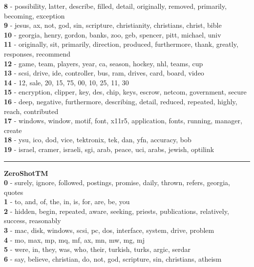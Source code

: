 \textbf{8} - possibility, latter, describe, filled, detail, originally, removed, primarily, becoming, exception\\
\textbf{9} - jesus, ax, not, god, sin, scripture, christianity, christians, christ, bible\\
\textbf{10} - georgia, henry, gordon, banks, zoo, geb, spencer, pitt, michael, univ\\
\textbf{11} - originally, sit, primarily, direction, produced, furthermore, thank, greatly, responses, recommend\\
\textbf{12} - game, team, players, year, ca, season, hockey, nhl, teams, cup\\
\textbf{13} - scsi, drive, ide, controller, bus, ram, drives, card, board, video\\
\textbf{14} - 12, sale, 20, 15, 75, 00, 10, 25, 11, 30\\
\textbf{15} - encryption, clipper, key, des, chip, keys, escrow, netcom, government, secure\\
\textbf{16} - deep, negative, furthermore, describing, detail, reduced, repeated, highly, reach, contributed\\
\textbf{17} - windows, window, motif, font, x11r5, application, fonts, running, manager, create\\
\textbf{18} - ysu, ico, dod, vice, tektronix, tek, dan, yfn, accuracy, bob\\
\textbf{19} - israel, cramer, israeli, sgi, arab, peace, uci, arabs, jewish, optilink\\
\hrule\vspace{2mm}
\noindent
\textbf{ZeroShotTM}\vspace{2mm}\\
\vspace{2mm}
\noindent
\textbf{0} - surely, ignore, followed, postings, promise, daily, thrown, refers, georgia, quotes\\
\textbf{1} - to, and, of, the, in, is, for, are, be, you\\
\textbf{2} - hidden, begin, repeated, aware, seeking, priests, publications, relatively, success, reasonably\\
\textbf{3} - mac, disk, windows, scsi, pc, dos, interface, system, drive, problem\\
\textbf{4} - mo, max, mp, mq, mf, ax, mn, mw, mg, mj\\
\textbf{5} - were, in, they, was, who, their, turkish, turks, argic, serdar\\
\textbf{6} - say, believe, christian, do, not, god, scripture, sin, christians, atheism\\
